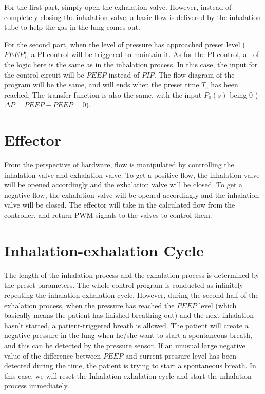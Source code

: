 \documentclass{article}
\begin{document}
For the first part, simply open the exhalation valve. However, instead of completely closing the inhalation valve, a basic flow is delivered by the inhalation tube to help the gas in the lung comes out.

For the second part, when the level of pressure has approached preset level ($PEEP$), a PI control will be triggered to maintain it. As for the PI control, all of the logic here is the same as in the inhalation process. In this case, the input for the control circuit will be $PEEP$ instead of $PIP$. The flow diagram of the program will be the same, and will ends when the preset time $T_e$ has been reached. The transfer function is also the same, with the input $P_0(s)$ being $0$ ($\Delta P=PEEP-PEEP=0$).

\section{Effector}
From the perspective of hardware, flow is manipulated by controlling the inhalation valve and exhalation valve. To get a positive flow, the inhalation valve will be opened accordingly and the exhalation valve will be closed. To get a negative flow, the exhalation valve will be opened accordingly and the inhalation valve will be closed. The effector will take in the calculated flow from the controller, and return PWM signals to the valves to control them.

\section{Inhalation-exhalation Cycle}
The length of the inhalation process and the exhalation process is determined by the preset parameters. The whole control program is conducted as infinitely repeating the inhalation-exhalation cycle. However, during the second half of the exhalation process, when the pressure has reached the $PEEP$ level (which basically means the patient has finished breathing out) and the next inhalation hasn't started, a patient-triggered breath is allowed. The patient will create a negative pressure in the lung when he/she want to start a spontaneous breath, and this can be detected by the pressure sensor. If an unusual large negative value of the difference between $PEEP$ and current pressure level has been detected during the time, the patient is trying to start a spontaneous breath. In this case, we will reset the Inhalation-exhalation cycle and start the inhalation process immediately.
\end{document}
